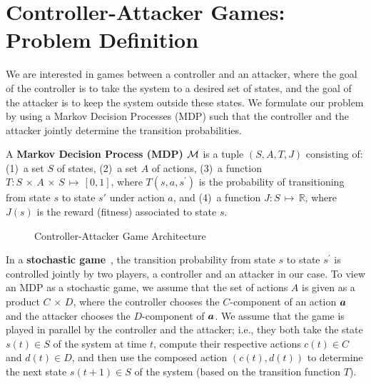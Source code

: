\section{Controller-Attacker Games: Problem Definition}
\label{sec:problem}

We are interested in games between a controller and an attacker, where the goal of the controller is to take the system to a desired set of states, and the goal of the attacker is to keep the system outside these states.  We formulate our problem by using a Markov Decision Processes (MDP) such that the controller and the attacker jointly determine the transition probabilities.

\begin{definition}A \textbf{Markov Decision Process (MDP)} ${\mathcal{M}}$ is a tuple $(S,A,T,J)$ consisting of: (1)~a set $S$ of states, (2)~a set $A$ of actions, (3)~a function $T: S\,{\times}\,A\,{\times}\,S\,{\mapsto}\,[0,1]$, where $T(s,a,s^\prime)$ is the probability of transitioning from state $s$ to state $s'$ under action $a$, and (4)~a function $J:S\,{\mapsto}\,\mathbb{R}$, where $J(s)$ is the reward (fitness) associated to state $s$.
\end{definition}

\begin{figure}[t]
	\centering
	
\vspace*{-2mm}
\caption{Controller-Attacker Game Architecture}
\label{fig:ampc}
     \vspace*{-3mm}
\end{figure}

In a \textbf{stochastic game}~\cite{shapley1953stochastic}, the transition probability from state $s$ to state $s^\prime$ is controlled jointly by two players, a controller and an attacker in our case. To view an MDP as a stochastic game, we assume that the set of actions $A$ is given as a product $C\,{\times}\,D$, where the controller chooses the $C$-component of an action ${\boldsymbol {a}}$ and the attacker chooses the $D$-component of ${\boldsymbol {a}}$. We assume that the game is played in parallel by the controller and the attacker; i.e., they both take the state
$s(t)\in {S}$ of the system at time $t$,  
compute their respective actions $c(t)\in C$ and $d(t)\in D$, 
and then use the composed action $(c(t),d(t))$
to determine the
next state $s(t+1)\in {S}$ of the system (based on the transition function $T$).

